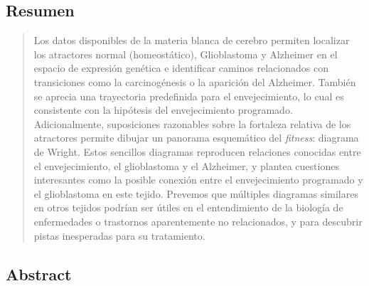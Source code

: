 \vfill

\begin{center}
\section*{Resumen}
\end{center}
\medskip

\begin{minipage}[c]{.9\linewidth}
\begin{quote}
	
{\large Los datos disponibles de la materia blanca de cerebro permiten localizar los atractores normal (homeostático), Glioblastoma y Alzheimer en el espacio de expresión genética e identificar caminos relacionados con transiciones como la carcinogénesis o la aparición del Alzheimer. También se aprecia una trayectoria predefinida para el envejecimiento, lo cual es consistente con la hipótesis del envejecimiento programado. Adicionalmente, suposiciones razonables sobre la fortaleza relativa de los atractores permite dibujar un panorama esquemático del \textit{fitness}: diagrama de Wright. Estos sencillos diagramas reproducen relaciones conocidas entre el envejecimiento, el glioblastoma y el Alzheimer, y plantea cuestiones interesantes como la posible conexión entre el envejecimiento programado y el glioblastoma en este tejido. Prevemos que múltiples diagramas similares en otros tejidos podrían ser útiles en el entendimiento de la biología de enfermedades o trastornos aparentemente no relacionados, y para descubrir pistas inesperadas para su tratamiento.}




\end{quote}
\end{minipage}

\smallskip
\vfill
\cleardoublepage

\begin{center}
\section*{Abstract}
\end{center}
\medskip

